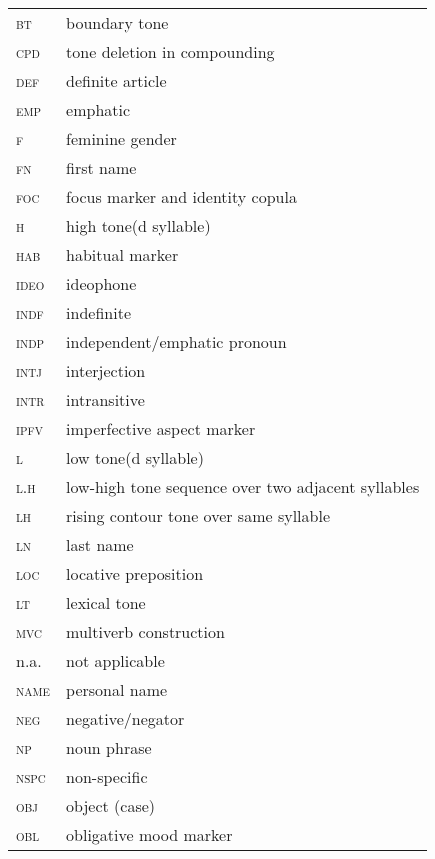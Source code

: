 \begin{tabularx}{.45\textwidth}{lQ}
 \textsc{bt} & boundary tone \\
 \textsc{cpd} & tone deletion in compounding \\
 \textsc{def} & definite article \\
 \textsc{emp} & emphatic \\
 \textsc{f} & feminine gender \\
 \textsc{fn} & first name \\
 \textsc{foc} & focus marker and identity copula \\
 \textsc{h} & high tone(d syllable) \\
 \textsc{hab} & habitual marker \\
 \textsc{ideo} & ideophone \\
 \textsc{indf} & indefinite \\
 \textsc{indp} & independent/emphatic pronoun \\
 \textsc{intj} & interjection \\
 \textsc{intr} & intransitive \\
\textsc{ipfv} & imperfective aspect marker \\
 \textsc{l} & low tone(d syllable) \\
 \textsc{l.h} & low-high tone sequence over two adjacent syllables \\
\textsc{lh} & rising contour tone over same syllable\\
\textsc{ln} & last name\\
\textsc{loc} & locative preposition\\
\textsc{lt} & lexical tone\\
\textsc{mvc} & multiverb construction\\
n.a. & not applicable\\
\textsc{name} & personal name\\
\textsc{neg} & negative/negator\\
\textsc{np} & noun phrase\\
\textsc{nspc} & non-specific\\
\textsc{obj} & object (case)\\
\textsc{obl} & obligative mood marker\\
\end{tabularx}
\newpage 
